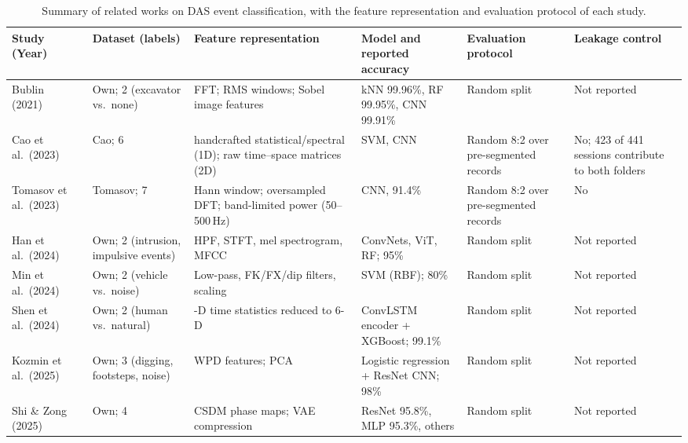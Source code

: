 \begin{landscape}
\begin{table}[p]
\centering
\caption{Summary of related works on DAS event classification, with the feature representation and evaluation protocol of each study.}
\label{tab:relatedworks}
\scriptsize
\setlength{\tabcolsep}{4pt}
\renewcommand{\arraystretch}{1.2}
\begin{tabular}{@{}>{\raggedright\arraybackslash}p{2.3cm} >{\raggedright\arraybackslash}p{2.8cm} >{\raggedright\arraybackslash}p{3.7cm} >{\raggedright\arraybackslash}p{4.2cm} >{\raggedright\arraybackslash}p{3.4cm} >{\raggedright\arraybackslash}p{3.7cm}@{}}
\toprule
\textbf{Study (Year)} & \textbf{Dataset (labels)} & \textbf{Feature representation} & \textbf{Model and reported accuracy} & \textbf{Evaluation protocol} & \textbf{Leakage control}\\
\midrule
Bublin (2021)~\cite{bublin2021event} & Own; 2 (excavator vs.\ none) & FFT; RMS windows; Sobel image features & kNN 99.96\%, RF 99.95\%, CNN 99.91\% & Random split & Not reported\\
Cao et al.\ (2023)~\cite{caoxin2023opendataset} & Cao; 6 & 16 handcrafted statistical/spectral (1D); raw time--space matrices (2D) & SVM, CNN & Random 8:2 over pre-segmented records & No; 423 of 441 sessions contribute to both folders\\
Tomasov et al.\ (2023)~\cite{tomasov2023enhancing} & Tomasov; 7 & Hann window; oversampled DFT; band-limited power (50--500\,Hz) & CNN, 91.4\% & Random 8:2 over pre-segmented records & No\\
Han et al.\ (2024)~\cite{han2024intrusion} & Own; 2 (intrusion, impulsive events) & HPF, STFT, mel spectrogram, MFCC & ConvNets, ViT, RF; 95\% & Random split & Not reported\\
Min et al.\ (2024)~\cite{min2024vehicle} & Own; 2 (vehicle vs.\ noise) & Low-pass, FK/FX/dip filters, scaling & SVM (RBF); 80\% & Random split & Not reported\\
Shen et al.\ (2024)~\cite{shen2024abnormal} & Own; 2 (human vs.\ natural) & 16-D time statistics reduced to 6-D & ConvLSTM encoder + XGBoost; 99.1\% & Random split & Not reported\\
Kozmin et al.\ (2025)~\cite{kozmin2025wavelet} & Own; 3 (digging, footsteps, noise) & WPD features; PCA & Logistic regression + ResNet CNN; 98\% & Random split & Not reported\\
Shi \& Zong (2025)~\cite{shi2025benchmarking} & Own; 4 & CSDM phase maps; VAE compression & ResNet 95.8\%, MLP 95.3\%, others & Random split & Not reported\\

\end{tabular}
\end{table}
\end{landscape}
